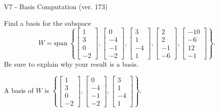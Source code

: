 \begin{exercise}
  \begin{exerciseTitle}V7 - Basis Computation (ver. 173)\end{exerciseTitle}
  \begin{exerciseStatement}
    Find a basis for the subspace 
\[W=\mathrm{span}\ \left\{\left[\begin{array}{r}
1 \\
3 \\
0 \\
-2
\end{array}\right] , \left[\begin{array}{r}
0 \\
-4 \\
-1 \\
-2
\end{array}\right] , \left[\begin{array}{r}
3 \\
1 \\
-4 \\
1
\end{array}\right] , \left[\begin{array}{r}
2 \\
2 \\
-1 \\
-6
\end{array}\right] , \left[\begin{array}{r}
-10 \\
-6 \\
12 \\
-1
\end{array}\right]\right\}.\]
 Be sure to explain why your result is a basis.


  \end{exerciseStatement}
  \begin{exerciseAnswer}
   A basis of \(W\) is  \(\left\{\left[\begin{array}{r}
1 \\
3 \\
0 \\
-2
\end{array}\right] , \left[\begin{array}{r}
0 \\
-4 \\
-1 \\
-2
\end{array}\right] , \left[\begin{array}{r}
3 \\
1 \\
-4 \\
1
\end{array}\right]\right\}\).
  


  \end{exerciseAnswer}
\end{exercise}